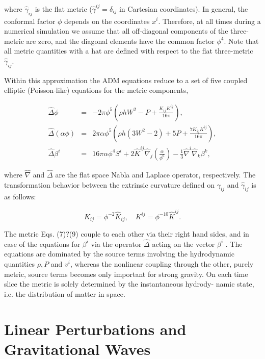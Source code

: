 \documentclass[12pt]{article}
\begin{document}
{where $\hat \gamma_{ij}$ is the flat metric ($\hat \gamma^{ij}=\delta_{ij}$ in Cartesian coordinates). In general, the conformal factor $\phi$ depends on the coordinates $x^i$. Therefore, at all times during a numerical simulation we assume that all off-diagonal components of the three-metric are zero, and the diagonal elements have the common factor $\phi^4$. Note that all metric quantities with a hat are defined with respect to the flat three-metric $\hat \gamma_{ij}$.

Within this approximation the ADM equations reduce to a set of five coupled elliptic (Poisson-like) equations for the metric components,

\begin{eqnarray}
\hat{\Delta} \phi &=&-2 \pi \phi^{5}\left(\rho h W^{2}-P+\frac{K_{i j} K^{i j}}{16 \pi}\right), \\
\hat{\Delta}(\alpha \phi) &=&2 \pi \alpha \phi^{5}\left(\rho h\left(3 W^{2}-2\right)+5 P+\frac{7 K_{i j} K^{i j}}{16 \pi}\right),\\
\hat{\Delta} \beta^{i} &=&16 \pi \alpha \phi^{4} S^{i}+2 \hat{K}^{i j} \hat{\nabla}_{j}\left(\frac{\alpha}{\phi^{6}}\right)-\frac{1}{3} \hat{\nabla}^{i} \hat{\nabla}_{k} \beta^{k},
\end{eqnarray}

where $\hat\nabla$ and   $\hat\Delta$ are the flat space Nabla and Laplace operator, respectively. The transformation behavior between the extrinsic curvature defined on $\gamma_{ij}$ and $\hat \gamma_{ij}$  is as follows:

\begin{equation}
K_{i j}=\phi^{-2} \hat{K}_{i j}, \quad K^{i j}=\phi^{-10} \hat{K}^{i j}.
\end{equation}

The metric Eqs. (7)?(9) couple to each other via their right hand sides, and in case of the equations for $\beta^i$ via the operator $\hat\Delta$ acting on the vector $\beta^i$ . The equations are dominated by the source terms involving the hydrodynamic quantities $\rho, P$ and $v^i$, whereas the nonlinear coupling through the other, purely metric, source terms becomes only important for strong gravity. On each time slice the metric is solely determined by the instantaneous hydrody- namic state, i.e. the distribution of matter in space.


\newpage

\section{Linear Perturbations and Gravitational Waves}

}
\end{document}
